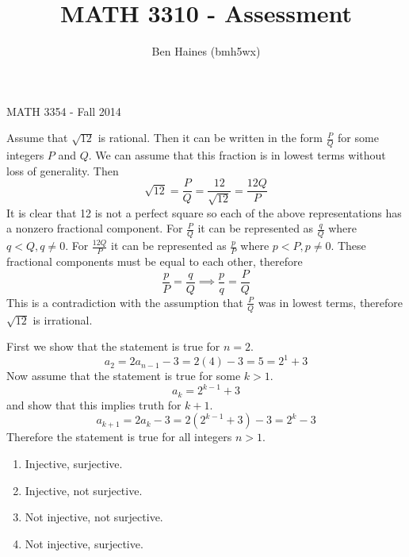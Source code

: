 \documentclass[paper=a4, fontsize=11pt]{jhwhw} %
\begin{document}
\title{MATH 3310 - Assessment}
\author{Ben Haines (bmh5wx)}
MATH 3354 - Fall 2014

Assume that $\sqrt{12}$ is rational. Then it can be written in the form $\frac{P}{Q}$ for some integers $P$ and $Q$. We can assume that this fraction is in lowest terms without loss of generality. Then
$$\sqrt{12} = \frac{P}{Q} = \frac{12}{\sqrt{12}} = \frac{12Q}{P}$$
It is clear that 12 is not a perfect square so each of the above representations has a nonzero fractional component. For $\frac{P}{Q}$ it can be represented as $\frac{q}{Q}$ where $q < Q, q\not=0$. For $\frac{12Q}{P}$ it can be represented as $\frac{p}{P}$ where $p < P, p\not=0$. These fractional components must be equal to each other, therefore
$$\frac{p}{P} = \frac{q}{Q} \implies \frac{p}{q} = \frac{P}{Q}$$
This is a contradiction with the assumption that $\frac{P}{Q}$ was in lowest terms, therefore $\sqrt{12}$ is irrational.

First we show that the statement is true for $n=2$. 
$$a_2 = 2a_{n-1} - 3 = 2(4) - 3 = 5 = 2^1 + 3$$
Now assume that the statement is true for some $k > 1$.
$$a_k = 2^{k-1} + 3$$ 
and show that this implies truth for $k+1$.
$$a_{k+1} = 2a_{k} - 3 = 2(2^{k-1} + 3) - 3 = 2^k -3$$
Therefore the statement is true for all integers $n > 1$. 

\begin{enumerate}
    \item
        Injective, surjective.
    \item
        Injective, not surjective.
    \item
        Not injective, not surjective.
    \item
        Not injective, surjective.
\end{enumerate}
\end{document}

